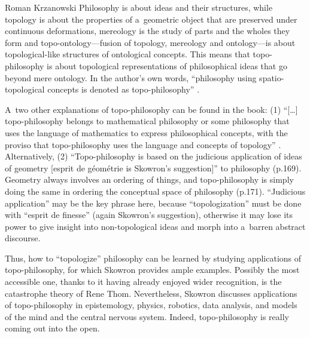 \begin{newrevengenv}{Roman Krzanowski}
Philosophy is about ideas and their structures, while topology is about the properties of a~geometric object that are preserved under continuous deformations, mereology is the study of parts and the wholes they form and topo-ontology---fusion of topology, mereology and ontology---is about topological-like structures of ontological concepts. This means that topo-philosophy is about topological representations of philosophical ideas that go beyond mere ontology. In the author's own words, ``philosophy using spatio-topological concepts is denoted as topo-philosophy'' 
\parencite[][p.xi]{skowron_czesc_2021}.%




A~two other explanations of topo-philosophy can be found in the book: (1) ``[…] topo-philosophy belongs to mathematical philosophy or some philosophy that uses the language of mathematics to express philosophical concepts, with the proviso that topo-philosophy uses the language and concepts of topology'' 
\parencite[][p.153]{skowron_czesc_2021}. %
 Alternatively, (2) ``Topo-philosophy is based on the judicious application of ideas of geometry [esprit de géométrie is Skowron's suggestion]'' to philosophy (p.169). Geometry always involves an ordering of things, and topo-philosophy is simply doing the same in ordering the conceptual space of philosophy (p.171). ``Judicious application'' may be the key phrase here, because ``topologization'' must be done with ``esprit de finesse'' (again Skowron's suggestion), otherwise it may lose its power to give insight into non-topological ideas and morph into a~barren abstract discourse.



Thus, how to ``topologize'' philosophy can be learned by studying applications of topo-philosophy, for which Skowron provides ample examples. Possibly the most accessible one, thanks to it having already enjoyed wider recognition, is the catastrophe theory of Rene Thom. Nevertheless, Skowron discusses applications of topo-philosophy in epistemology, physics, robotics, data analysis, and models of the mind and the central nervous system. Indeed, topo-philosophy is really coming out into the open.




\end{newrevengenv}

